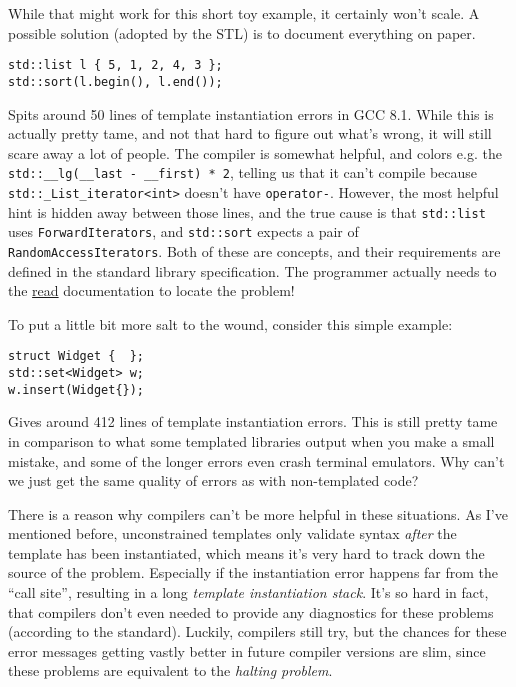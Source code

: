     While that might work for this short toy example, it certainly won't scale. A possible solution (adopted by the STL) is to document everything on paper.

    

    \begin{lstlisting}
std::list l { 5, 1, 2, 4, 3 };
std::sort(l.begin(), l.end()); \end{lstlisting}

\noindent Spits around 50 lines of template instantiation errors in GCC 8.1. While this is actually pretty tame, and not that hard to figure out what's wrong, it will still scare away a lot of people. The compiler is somewhat helpful, and colors e.g. the \texttt{std::\_\_lg(\_\_last - \_\_first) * 2}, telling us that it can't compile because \texttt{std::\_List\_iterator<int>} doesn't have \texttt{operator-}. However, the most helpful hint is hidden away between those lines, and the true cause is that \texttt{std::list} uses \texttt{ForwardIterators}, and \texttt{std::sort} expects a pair of \texttt{RandomAccessIterators}. Both of these are concepts, and their requirements are defined in the standard library specification. The programmer actually needs to the \underline{read} documentation to locate the problem!

To put a little bit more salt to the wound, consider this simple example:

    \begin{lstlisting}
struct Widget {  };
std::set<Widget> w;
w.insert(Widget{}); \end{lstlisting}

\noindent Gives around 412 lines of template instantiation errors. This is still pretty tame in comparison to what some templated libraries output when you make a small mistake, and some of the longer errors even crash terminal emulators. Why can't we just get the same quality of errors as with non-templated code?

There is a reason why compilers can't be more helpful in these situations. As I've mentioned before, unconstrained templates only validate syntax \emph{after} the template has been instantiated, which means it's very hard to track down the source of the problem. Especially if the instantiation error happens far from the ``call site'', resulting in a long \emph{template instantiation stack}. It's so hard in fact, that compilers don't even needed to provide any diagnostics for these problems (according to the standard). Luckily, compilers still try, but the chances for these error messages getting vastly better in future compiler versions are slim, since these problems are equivalent to the \emph{halting problem}.

